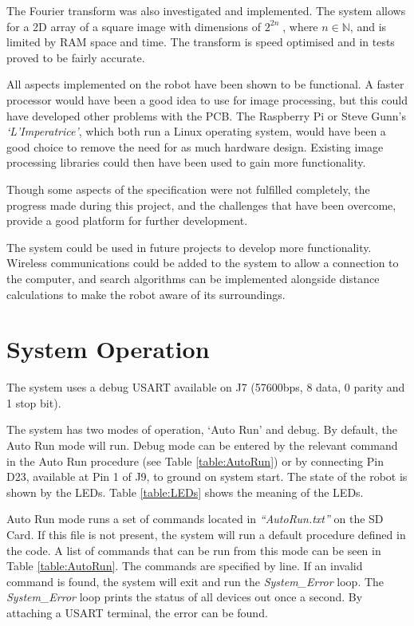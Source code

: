 The Fourier transform was also investigated and implemented. The system allows for a 2D array of a square image with dimensions of $2^{2n}\; $, where $n \in \mathbb{N}$, and is limited by RAM space and time. The transform is speed optimised and in tests proved to be fairly accurate. 

All aspects implemented on the robot have been shown to be functional. A faster processor would have been a good idea to use for image processing, but this could have developed other problems with the PCB. The Raspberry Pi or Steve Gunn's \textit{`L'Imperatrice'}, which both run a Linux operating system, would have been a good choice to remove the need for as much hardware design. Existing image processing libraries could then have been used to gain more functionality. 

Though some aspects of the specification were not fulfilled completely, the progress made during this project, and the challenges that have been overcome, provide a good platform for further development.

The system could be used in future projects to develop more functionality. Wireless communications could be added to the system to allow a connection to the computer, and search algorithms can be implemented alongside distance calculations to make the robot aware of its surroundings. 

\section{System Operation}

The system uses a debug USART available on J7 (57600bps, 8 data, 0 parity and 1 stop bit).

The system has two modes of operation, `Auto Run' and debug. By default, the Auto Run mode will run. Debug mode can be entered by the relevant command in the Auto Run procedure (see Table \ref{table:AutoRun}) or by connecting Pin D23, available at Pin 1 of J9, to ground on system start. The state of the robot is shown by the LEDs. Table \ref{table:LEDs} shows the meaning of the LEDs.

Auto Run mode runs a set of commands located in \textit{``AutoRun.txt''} on the SD Card. If this file is not present, the system will run a default procedure defined in the code. A list of commands that can be run from this mode can be seen in Table \ref{table:AutoRun}. The commands are specified by line. If an invalid command is found, the system will exit and run the \textit{System\_Error} loop. The  \textit{System\_Error} loop prints the status of all devices out once a second. By attaching a USART terminal, the error can be found.

